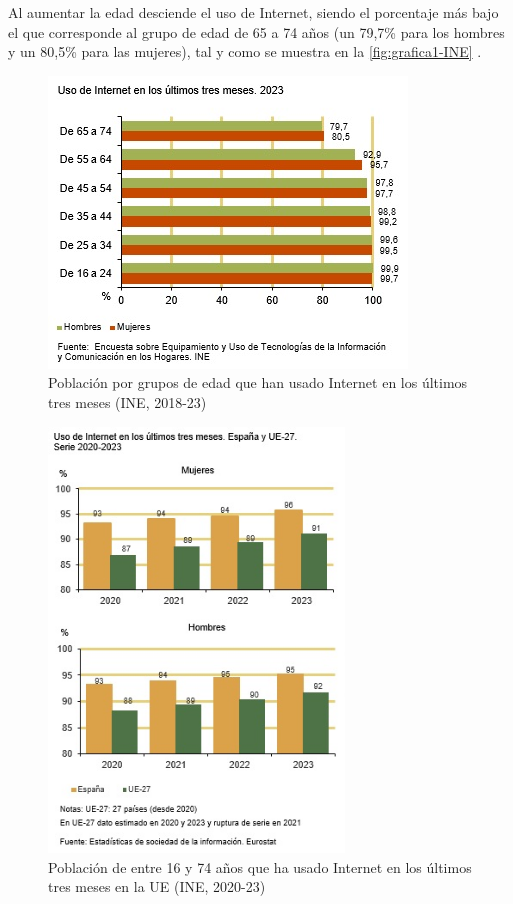 Al aumentar la edad desciende el uso de Internet, siendo el porcentaje más bajo el que corresponde al grupo de edad de 65 a 74 años (un 79,7\% para los hombres y un 80,5\% para las mujeres), tal y como se muestra en la \autoref{fig:grafica1-INE} \parencite{intro5}.

\begin{figure}[H]
	\centering
	\includegraphics{imgs/INE-grafica1.jpeg}
	\caption{Población por grupos de edad que han usado Internet en los últimos tres meses (INE, 2018-23)}
	\label{fig:grafica1-INE}
\end{figure}

\begin{figure}[H]
	\centering
	\includegraphics[width=0.7\textwidth]{imgs/INE-grafica2.jpeg}
	\caption{Población de entre 16 y 74 años que ha usado Internet en los últimos tres meses en la UE (INE, 2020-23)}
	\label{fig:grafica2-INE}
\end{figure}

